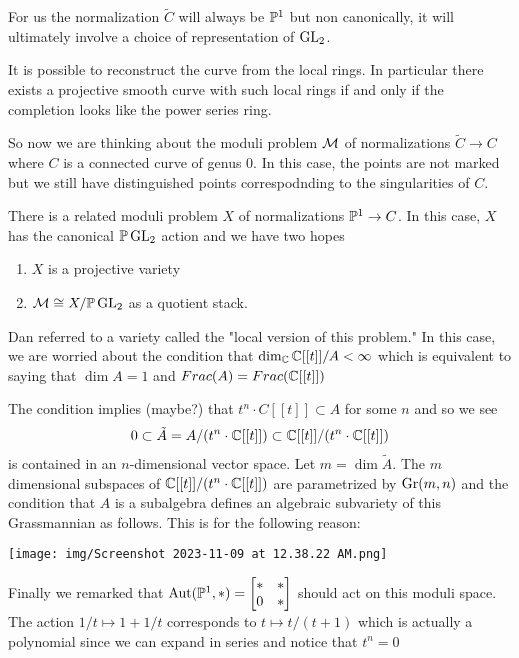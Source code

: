 \documentclass[12pt]{article}
\begin{document}
\hfill 

For us the normalization $\tilde C$ will always be $\P^1$ but non canonically, it will ultimately involve
a choice of representation of $\GL_2$.
\begin{remark}
    It is possible to reconstruct the curve from the local rings. In particular
    there exists a projective smooth curve with such local rings if and only if the completion looks like the power series ring.
\end{remark}

So now we are thinking about the moduli problem $\mc M$ of normalizations $\tilde C\to C$ where $C$ is a connected curve
of genus 0. In this case, the points are not marked but we still have distinguished points correspodnding
to the singularities of $C$.

There is a related moduli problem $X$ of normalizations $\P^1\to C$. In this case, $X$ has the canonical $\P\GL_2$ action
and we have two hopes \begin{enumerate}
    \item $X$ is a projective variety 
    \item $\mc M \cong X/\P\GL_2$ as a quotient stack. 
\end{enumerate}

Dan referred to a variety called the "local version of this problem." In this case, we are worried about
the condition that $\dim_\C \C[[t]]/A < \infty$ which is equivalent to saying that $\dim A = 1$ and $Frac(A) = Frac(\C[[t]])$

The condition implies (maybe?) that $t^n\cdot C[[t]]\subset A$ for some $n$ and so we see \begin{align*}
0 \subset \tilde A =  A/(t^n\cdot \C[[t]]) \subset \C[[t]]/(t^n\cdot \C[[t]])
\end{align*} is contained in an $n$-dimensional vector space. Let $m = \dim \tilde{A}$. The $m$ dimensional
subspaces of $\C[[t]]/(t^n\cdot \C[[t]])$ are parametrized by $\Gr(m,n)$ and the condition
that $A$ is a subalgebra defines an algebraic subvariety of this Grassmannian as follows. This is for the following reason:

\begin{center}
    \texttt{[image: img/Screenshot 2023-11-09 at 12.38.22 AM.png]}
\end{center}

\begin{remark}
    Finally we remarked that $\Aut(\P^1,*) = \begin{bmatrix}
        * & * \\
        0 & *
    \end{bmatrix}$ should act on this moduli space. The action $1/t\mapsto 1 + 1/t$ corresponds
    to $t\mapsto t/(t+1)$ which is actually a polynomial since we can expand in series and notice that $t^n = 0$
\end{remark}
\end{document}
